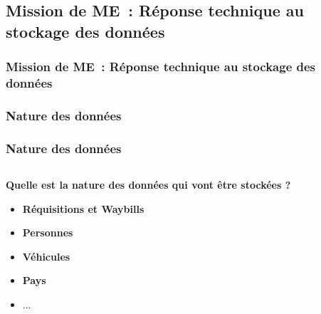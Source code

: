\subsection{Mission de ME~: Réponse technique au stockage des données}
\begin{frame}
	\frametitle{Mission de ME~: Réponse technique au stockage des données}
\end{frame}



\subsubsection[Nature des données]{Nature des données}
\begin{frame}
\frametitle{Nature des données}
\begin{columns}[c]
\begin{column}{12cm}
\begin{block}{\textbf{Quelle est la nature des données qui vont être stockées ?}}
\begin{itemize}
\item<2-> \textbf{Réquisitions et Waybills}
\item<3-> \textbf{Personnes}
\item<4-> \textbf{Véhicules}
\item<5-> \textbf{Pays}
\item<6-> ...
\end{itemize}
\end{block}
\end{column}
\end{columns}
\end{frame}

